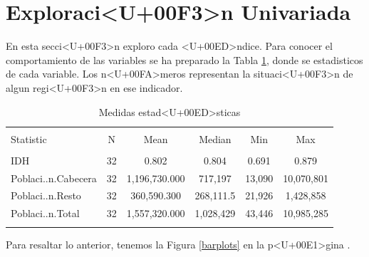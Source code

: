 \section{Exploraci<U+00F3>n Univariada}\label{univariada}
En esta secci<U+00F3>n exploro cada <U+00ED>ndice.
Para conocer el comportamiento de las variables se ha preparado la Tabla \ref{stats}, donde se estadisticos de cada variable. Los n<U+00FA>meros representan la situaci<U+00F3>n de algun regi<U+00F3>n en ese indicador.
\begin{table}[!htbp] \centering 
  \caption{Medidas estad<U+00ED>sticas} 
  \label{stats} 
\begin{tabular}{@{\extracolsep{5pt}}lccccc} 
\\[-1.8ex]\hline 
\hline \\[-1.8ex] 
Statistic & \multicolumn{1}{c}{N} & \multicolumn{1}{c}{Mean} & \multicolumn{1}{c}{Median} & \multicolumn{1}{c}{Min} & \multicolumn{1}{c}{Max} \\ 
\hline \\[-1.8ex] 
IDH & 32 & 0.802 & 0.804 & 0.691 & 0.879 \\ 
Poblaci..n.Cabecera & 32 & 1,196,730.000 & 717,197 & 13,090 & 10,070,801 \\ 
Poblaci..n.Resto & 32 & 360,590.300 & 268,111.5 & 21,926 & 1,428,858 \\ 
Poblaci..n.Total & 32 & 1,557,320.000 & 1,028,429 & 43,446 & 10,985,285 \\ 
\hline \\[-1.8ex] 
\end{tabular} 
\end{table} %
Para resaltar lo anterior, tenemos la Figura \ref{barplots} en la p<U+00E1>gina \pageref{barplots}.
